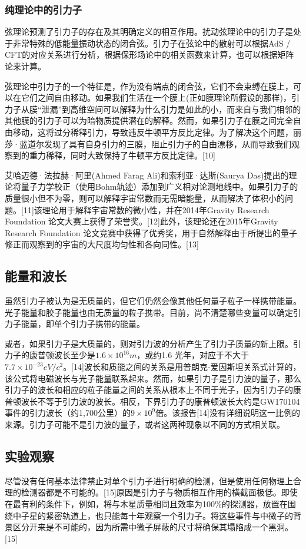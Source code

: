 \subsubsection{纯理论中的引力子}
弦理论预测了引力子的存在及其明确定义的相互作用。扰动弦理论中的引力子是处于非常特殊的低能量振动状态的闭合弦。引力子在弦论中的散射可以根据AdS / CFT的对应关系进行分析，根据保形场论中的相关函数来计算，也可以根据矩阵论来计算。

弦理论中引力子的一个特征是，作为没有端点的闭合弦，它们不会束缚在膜上，可以在它们之间自由移动。如果我们生活在一个膜上(正如膜理论所假设的那样)，引力子从膜“泄漏”到高维空间可以解释为什么引力是如此的小，而来自与我们相邻的其他膜的引力子可以为暗物质提供潜在的解释。然而，如果引力子在膜之间完全自由移动，这将过分稀释引力，导致违反牛顿平方反比定律。为了解决这个问题，丽莎·蓝道尔发现了具有自身引力的三膜，阻止引力子的自由漂移，从而导致我们观察到的重力稀释，同时大致保持了牛顿平方反比定律。[10]

艾哈迈德·法拉赫·阿里(Ahmed Farag Ali)和索利亚·达斯(Saurya Das)提出的理论将量子力学校正（使用Bohm轨迹）添加到广义相对论测地线中。如果引力子的质量很小但不为零，则可以解释宇宙常数而无需暗能量，从而解决了体积小的问题。[11]该理论用于解释宇宙常数的微小性，并在2014年Gravity Research Foundation 论文大赛上获得了荣誉奖。[12]此外，该理论还在2015年Gravity Research Foundation 论文竞赛中获得了优秀奖，用于自然解释由于所提出的量子修正而观察到的宇宙的大尺度均匀性和各向同性。[13]

\subsection{能量和波长}
虽然引力子被认为是无质量的，但它们仍然会像其他任何量子粒子一样携带能量。光子能量和胶子能量也由无质量的粒子携带。目前，尚不清楚哪些变量可以确定引力子能量，即单个引力子携带的能量。

或者，如果引力子是大质量的，则对引力波的分析产生了引力子质量的新上限。引力子的康普顿波长至少是$1.6\times10^{16}m$，或约1.6 光年，对应于不大于$7.7\times10^{-23} eV/c^{2}$。[14]波长和质能之间的关系是用普朗克-爱因斯坦关系式计算的，该公式将电磁波长与光子能量联系起来。然而，如果引力子是引力波的量子，那么引力子的波长和相应的粒子能量之间的关系从根本上不同于光子，因为引力子的康普顿波长不等于引力波的波长。相反，下界引力子的康普顿波长大约是GW170104事件的引力波长（约1,700公里）的$9\times10^{9}$倍。该报告[14]没有详细说明这一比例的来源。引力子可能不是引力波的量子，或者这两种现象以不同的方式相关联。

\subsection{实验观察}
尽管没有任何基本法律禁止对单个引力子进行明确的检测，但是使用任何物理上合理的检测器都是不可能的。[15]原因是引力子与物质相互作用的横截面极低。即使在最有利的条件下，例如，将与木星质量相同且效率为100\%的探测器，放置在围绕中子星的紧密轨道上，也只能每十年观察一个引力子。将这些事件与中微子的背景区分开来是不可能的，因为所需中微子屏蔽的尺寸将确保其塌陷成一个黑洞。[15]

